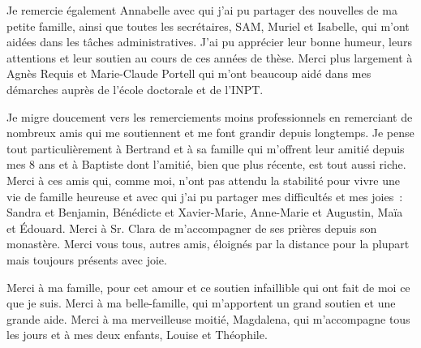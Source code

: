 \begin{fullwidth}
    Je remercie également Annabelle avec qui j'ai pu partager des nouvelles de ma petite famille, ainsi que toutes les secrétaires, SAM, Muriel et Isabelle, qui m'ont aidées dans les tâches administratives. J'ai pu apprécier leur bonne humeur, leurs attentions et leur soutien au cours de ces années de thèse. Merci plus largement à Agnès Requis et Marie-Claude Portell qui m'ont beaucoup aidé dans mes démarches auprès de l'école doctorale et de l'INPT. 
    
    Je migre doucement vers les remerciements moins professionnels en remerciant de nombreux amis qui me soutiennent et me font grandir depuis longtemps. Je pense tout particulièrement à Bertrand et à sa famille qui m'offrent leur amitié depuis mes 8 ans et à Baptiste dont l'amitié, bien que plus récente, est tout aussi riche. Merci à ces amis qui, comme moi, n'ont pas attendu la stabilité pour vivre une vie de famille heureuse et avec qui j'ai pu partager mes difficultés et mes joies~: Sandra et Benjamin, Bénédicte et Xavier-Marie, Anne-Marie et Augustin, Maïa et \'Edouard. Merci à Sr. Clara de m'accompagner de ses prières depuis son monastère. Merci vous tous, autres amis, éloignés par la distance pour la plupart mais toujours présents avec joie.
    
    Merci à ma famille, pour cet amour et ce soutien infaillible qui ont fait de moi ce que je suis. Merci à ma belle-famille, qui m'apportent un grand soutien et une grande aide. Merci à ma merveilleuse moitié, Magdalena, qui m'accompagne tous les jours et à mes deux enfants, Louise et Théophile.
    
    
\end{fullwidth}


